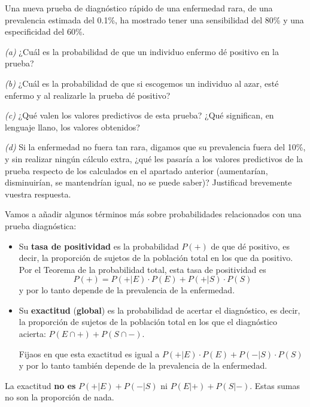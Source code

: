 \documentclass[
]{book}
\theoremstyle{definition}
\theoremstyle{definition}
\theoremstyle{definition}
\theoremstyle{definition}
\theoremstyle{remark}
\begin{document}
\begin{rmdexercici}
Una nueva prueba de diagnóstico rápido de una enfermedad rara, de una prevalencia estimada del 0.1\%, ha mostrado tener una sensibilidad del 80\% y una especificidad del 60\%.

\emph{(a)} ¿Cuál es la probabilidad de que un individuo enfermo dé positivo en la prueba?

\emph{(b)} ¿Cuál es la probabilidad de que si escogemos un individuo al azar, esté enfermo y al realizarle la prueba dé positivo?

\emph{(c)} ¿Qué valen los valores predictivos de esta prueba? ¿Qué significan, en lenguaje llano, los valores obtenidos?

\emph{(d)} Si la enfermedad no fuera tan rara, digamos que su prevalencia fuera del 10\%, y sin realizar ningún cálculo extra, ¿qué les pasaría a los valores predictivos de la prueba respecto de los calculados en el apartado anterior (aumentarían, disminuirían, se mantendrían igual, no se puede saber)? Justificad brevemente vuestra respuesta.
\end{rmdexercici}

Vamos a añadir algunos términos más sobre probabilidades relacionados con una prueba diagnóstica:

\begin{itemize}
\item
  Su \textbf{tasa de positividad} es la probabilidad \(P(+)\) de que dé positivo, es decir, la proporción de sujetos de la población total en los que da positivo. Por el Teorema de la probabilidad total, esta tasa de positividad es
  \[
  P(+)=P(+|E)\cdot P(E)+P(+|S)\cdot P(S)
  \]
  y por lo tanto depende de la prevalencia de la enfermedad.
\item
  Su \textbf{exactitud} (\textbf{global}) es la probabilidad de acertar el diagnóstico, es decir, la proporción de sujetos de la población total en los que el diagnóstico acierta: \(P(E\cap +)+P(S\cap -)\).

  Fijaos en que esta exactitud es igual a \(P(+|E)\cdot P(E)+P(-|S)\cdot P(S)\) y por lo tanto también depende de la prevalencia de la enfermedad.
\end{itemize}

\begin{rmdcaution}
La exactitud \textbf{no es} \(P(+|E)+P(-|S)\) ni \(P(E|+)+P(S|-)\). Estas sumas no son la proporción de nada.
\end{rmdcaution}
\end{document}
